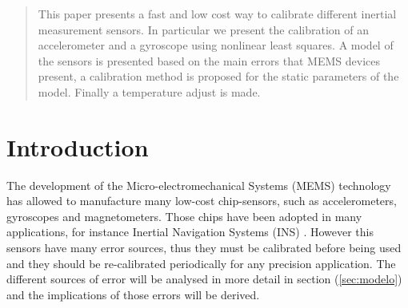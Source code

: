 \documentclass[conference]{IEEEtran}
\newcommand{\refp}[1]{(\ref{#1})}
\begin{document}




\maketitle


\begin{abstract}
This paper presents a fast and low cost way to calibrate different inertial measurement sensors. In particular we present the calibration of an accelerometer and a gyroscope using nonlinear least squares. A model of the sensors is presented based on the main errors that MEMS devices present, a calibration method is proposed for the static parameters of the model. Finally a temperature adjust is made.  
\end{abstract}





%
\IEEEpeerreviewmaketitle

\section{Introduction}
The development of the Micro-electromechanical Systems (MEMS) technology has allowed to manufacture many low-cost chip-sensors, such as accelerometers, gyroscopes and magnetometers. Those chips have been adopted in many applications, for instance Inertial Navigation Systems  (INS) \cite{bib:un_puto_nuevo}. However this sensors have many error sources, thus they must be calibrated before being used and they should be re-calibrated periodically for any precision application. The different sources of error will be analysed in more detail in section \refp{sec:modelo} and the implications of those errors will be derived.\\ 
\end{document}
